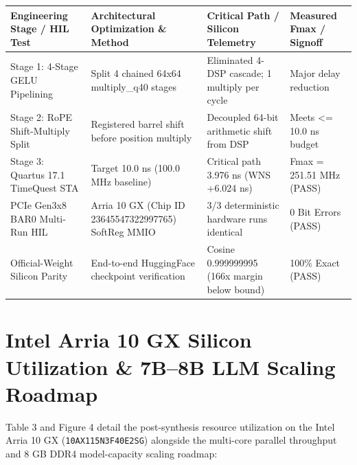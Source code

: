 \documentclass[11pt,a4paper]{article}
\begin{document}
{\footnotesize\renewcommand{\arraystretch}{1.14}\begin{longtable}{@{}L{0.23\textwidth}L{0.27\textwidth}L{0.24\textwidth}L{0.16\textwidth}@{}}\toprule

\textbf{Engineering Stage /\allowbreak{} HIL Test} & \textbf{Architectural Optimization \& Method} & \textbf{Critical Path /\allowbreak{} Silicon Telemetry} & \textbf{Measured Fmax /\allowbreak{} Signoff}\\\midrule\endhead

Stage 1: 4-Stage GELU Pipelining & Split 4 chained 64x64 multiply\_\allowbreak{}q40 stages & Eliminated 4-DSP cascade; 1 multiply per cycle & Major delay reduction\\[2pt]

Stage 2: RoPE Shift-Multiply Split & Registered barrel shift before position multiply & Decoupled 64-bit arithmetic shift from DSP & Meets <=\allowbreak{} 10.0 ns budget\\[2pt]

Stage 3: Quartus 17.1 TimeQuest STA & Target 10.0 ns (\allowbreak{}100.0 MHz baseline)\allowbreak{} & Critical path 3.976 ns (\allowbreak{}WNS +\allowbreak{}6.024 ns)\allowbreak{} & Fmax =\allowbreak{} 251.51 MHz (\allowbreak{}PASS)\allowbreak{}\\[2pt]

PCIe Gen3x8 BAR0 Multi-Run HIL & Arria 10 GX (\allowbreak{}Chip ID 23645547\allowbreak{}32299776\allowbreak{}5)\allowbreak{} SoftReg MMIO & 3/\allowbreak{}3 deterministic hardware runs identical & 0 Bit Errors (\allowbreak{}PASS)\allowbreak{}\\[2pt]

Official-Weight Silicon Parity & End-to-end HuggingFace checkpoint verification & Cosine 0.99999999\allowbreak{}5 (\allowbreak{}166x margin below bound)\allowbreak{} & 100\% Exact (\allowbreak{}PASS)\allowbreak{}\\[2pt]

\bottomrule\end{longtable}}

\section{Intel Arria 10 GX Silicon Utilization \& 7B--8B LLM Scaling Roadmap}

Table 3 and Figure 4 detail the post-synthesis resource utilization on the Intel Arria 10 GX (\texttt{10AX115N3F40E2SG}) alongside the multi-core parallel throughput and 8 GB DDR4 model-capacity scaling roadmap:
\end{document}
